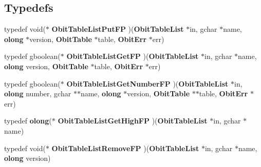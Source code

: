 \subsection*{Typedefs}
\begin{CompactItemize}
\item 
typedef void($\ast$ {\bf Obit\-Table\-List\-Put\-FP} )({\bf Obit\-Table\-List} $\ast$in, gchar $\ast$name, {\bf olong} $\ast$version, {\bf Obit\-Table} $\ast$table, {\bf Obit\-Err} $\ast$err)
\item 
typedef gboolean($\ast$ {\bf Obit\-Table\-List\-Get\-FP} )({\bf Obit\-Table\-List} $\ast$in, gchar $\ast$name, {\bf olong} version, {\bf Obit\-Table} $\ast$table, {\bf Obit\-Err} $\ast$err)
\item 
typedef gboolean($\ast$ {\bf Obit\-Table\-List\-Get\-Number\-FP} )({\bf Obit\-Table\-List} $\ast$in, {\bf olong} number, gchar $\ast$$\ast$name, {\bf olong} $\ast$version, {\bf Obit\-Table} $\ast$$\ast$table, {\bf Obit\-Err} $\ast$err)
\item 
typedef {\bf olong}($\ast$ {\bf Obit\-Table\-List\-Get\-High\-FP} )({\bf Obit\-Table\-List} $\ast$in, gchar $\ast$name)
\item 
typedef void($\ast$ {\bf Obit\-Table\-List\-Remove\-FP} )({\bf Obit\-Table\-List} $\ast$in, gchar $\ast$name, {\bf olong} version)
\end{CompactItemize}
